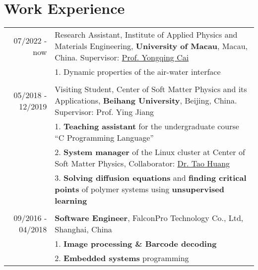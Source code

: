\documentclass[a4paper,10pt]{article} %
\begin{document}
\section{Work Experience}
\begin{tabular}{r|p{11cm}}
	07/2022 - now            & Research Assistant,  Institute of Applied Physics and Materials Engineering, \textbf{University of Macau}, Macau, China. Supervisor: \href{https://iapme.um.edu.mo/staff/academic-staff/cai-yongqing/} {Prof. Yongqing Cai}  \\
	& 1. Dynamic properties of the air-water interface \\
	\multicolumn{2}{c}{} \\	%
	05/2018 - 12/2019            & Visiting Student,  Center of Soft Matter Physics and its Applications, \textbf{Beihang University}, Beijing, China. Supervisor: Prof. Ying Jiang  \\
	& 1. \textbf{Teaching assistant} for the undergraduate course “C Programming Language” \\
	& 2. \textbf{System manager} of the Linux cluster at Center of Soft Matter Physics, Collaborator: \href{http://taohonker.science/}{Dr. Tao Huang}\\
	& 3. \textbf{Solving diffusion equations} and \textbf{finding critical points} of polymer systems using \textbf{unsupervised learning}\\
	\multicolumn{2}{c}{} \\	%
	09/2016 - 04/2018            & \textbf{Software Engineer}, FalconPro Technology Co., Ltd, Shanghai, China \\                          & 1. \textbf{Image processing \& Barcode decoding}\\
								& 2. \textbf{Embedded systems} programming\\
\end{tabular}
\end{document}
